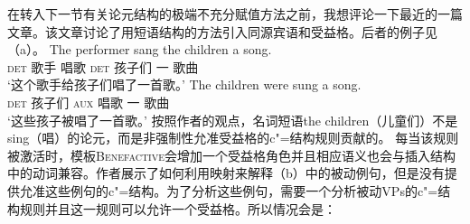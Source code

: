     在转入下一节有关论元结构的极端不充分赋值方法之前，我想评论一下\citet*{AGT2014a}最近的一篇文章。该文章讨论了用短语结构的方法引入同源宾语和受益格。后者的例子见（a）。
\eal
\ex 
\gll The performer sang the children a song.\\
     \textsc{det} 歌手 唱歌 \textsc{det} 孩子们 一 歌曲\\
\glt `这个歌手给孩子们唱了一首歌。'
\ex 
\gll The children were sung a song.\\
     \textsc{det} 孩子们 \textsc{aux} 唱歌 一 歌曲\\
\glt `这些孩子被唱了一首歌。'
\zl
按照作者的观点，名词短语the children（儿童们）不是sing（唱）的论元，而是非强制性允准受益格的c"=结构规则贡献的。
\ea\label{c-struc-vp-benefactive}
\z
每当该规则被激活时，模板\textsc{Benefactive}会增加一个受益格角色并且相应语义也会与插入结构中的动词兼容。作者展示了如何利用映射来解释（b）中的被动例句，但是没有提供允准这些例句的c"=结构。为了分析这些例句，需要一个分析被动VPs的c"=结构规则并且这一规则可以允许一个受益格。所以情况会是：
